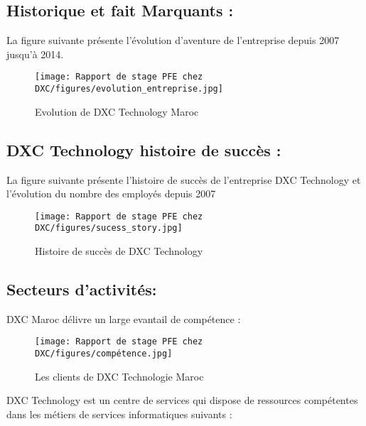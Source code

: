 \newpage

\subsection{Historique et fait Marquants :}

La figure suivante présente l’évolution d’aventure de l’entreprise depuis 2007 jusqu’à 2014.

\begin{figure}[!h]
    \centering
    \texttt{[image: Rapport de stage PFE chez DXC/figures/evolution\_entreprise.jpg]}
    \caption{Evolution de DXC Technology Maroc}
\end{figure}

\newpage
\subsection{DXC Technology histoire de succès :}

La figure suivante présente l’histoire de succès de l’entreprise DXC Technology et l’évolution du nombre des employés depuis 2007

\begin{figure}[!h]
    \centering
    \texttt{[image: Rapport de stage PFE chez DXC/figures/sucess\_story.jpg]}
    \caption{Histoire de succès de DXC Technology}
\end{figure}

\subsection{Secteurs d’activités:}

DXC Maroc délivre un large evantail de compétence :

\begin{figure}[!h]
    \centering
    \texttt{[image: Rapport de stage PFE chez DXC/figures/compétence.jpg]}
    \caption{Les clients de DXC Technologie Maroc}
\end{figure}

\newpage
DXC Technology est un centre de services qui dispose de ressources compétentes dans les
métiers de services informatiques suivants :

